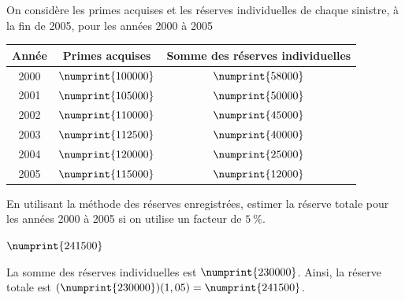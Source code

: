 \begin{exercice}
  On considère les primes acquises et les réserves individuelles de
  chaque sinistre, à la fin de 2005, pour les années 2000 à 2005
  \begin{center}
    \begin{tabular}{|c | c c|}\hline
      Année & Primes acquises & Somme des réserves individuelles \\ \hline
      2000 & $\numprint{100000}$ & $\numprint{58000}$\\
      2001 & $\numprint{105000}$ & $\numprint{50000}$\\
      2002 & $\numprint{110000}$ & $\numprint{45000}$\\
      2003 & $\numprint{112500}$ & $\numprint{40000}$\\
      2004 & $\numprint{120000}$ & $\numprint{25000}$\\
      2005 & $\numprint{115000}$ & $\numprint{12000}$ \\ \hline
    \end{tabular}
  \end{center}
  En utilisant la méthode des réserves enregistrées, estimer la
  réserve totale pour les années 2000 à 2005 si on utilise un facteur
  de $5~\%$.
  \begin{rep}
    $\numprint{241500}$
  \end{rep}
  \begin{sol}
    La somme des réserves individuelles est $\numprint{230000}$.
    Ainsi, la réserve totale est
    $(\numprint{230000})(1,05) = \numprint{241500}$.
  \end{sol}
\end{exercice}

